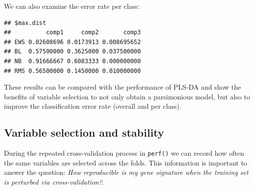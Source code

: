 \documentclass[]{book}
\newenvironment{Shaded}{\begin{snugshade}}{\end{snugshade}}
\newcommand{\CommentTok}[1]{\textcolor[rgb]{0.56,0.35,0.01}{\textit{#1}}}
\newcommand{\DataTypeTok}[1]{\textcolor[rgb]{0.13,0.29,0.53}{#1}}
\newcommand{\DecValTok}[1]{\textcolor[rgb]{0.00,0.00,0.81}{#1}}
\newcommand{\KeywordTok}[1]{\textcolor[rgb]{0.13,0.29,0.53}{\textbf{#1}}}
\newcommand{\NormalTok}[1]{#1}
\newcommand{\OperatorTok}[1]{\textcolor[rgb]{0.81,0.36,0.00}{\textbf{#1}}}
\newcommand{\StringTok}[1]{\textcolor[rgb]{0.31,0.60,0.02}{#1}}
\begin{document}
We can also examine the error rate per class:

\begin{Shaded}
\end{Shaded}

\begin{verbatim}
## $max.dist
##          comp1     comp2       comp3
## EWS 0.02608696 0.0173913 0.008695652
## BL  0.57500000 0.3625000 0.037500000
## NB  0.91666667 0.6083333 0.000000000
## RMS 0.56500000 0.1450000 0.010000000
\end{verbatim}

These results can be compared with the performance of PLS-DA and show the benefits of variable selection to not only obtain a parsimonious model, but also to improve the classification error rate (overall and per class).

\hypertarget{plsda:stab}{%
\subsection{Variable selection and stability}\label{plsda:stab}}

During the repeated cross-validation process in \texttt{perf()} we can record how often the same variables are selected across the folds. This information is important to answer the question: \emph{How reproducible is my gene signature when the training set is perturbed via cross-validation?}.

\begin{Shaded}
\end{Shaded}
\end{document}
